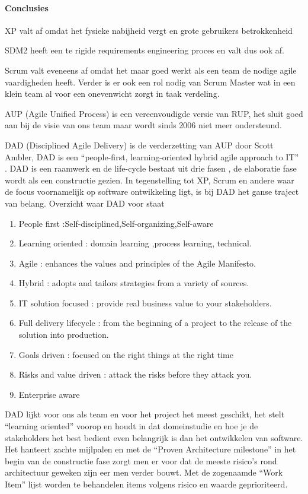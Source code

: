 \paragraph{Conclusies}
\begin{description}
\item XP valt af omdat het fysieke nabijheid vergt en grote gebruikers betrokkenheid
\item SDM2 heeft een te rigide requirements engineering proces en valt dus ook af.
\item Scrum valt eveneens af omdat het maar goed werkt als een team de nodige agile vaardigheden heeft. Verder is er ook een rol nodig van Scrum Master wat in een klein team al voor een onevenwicht zorgt in taak verdeling.
\item AUP (Agile Unified Process) is een vereenvoudigde versie van RUP, het sluit goed aan bij de visie van ons team maar wordt sinds 2006 niet meer ondersteund. 
\item DAD (Disciplined Agile Delivery) is de verderzetting van AUP door Scott Ambler, DAD is een ``people-first, learning-oriented hybrid agile approach to IT'' . DAD is een raamwerk en de life-cycle bestaat uit drie fasen , de elaboratie fase wordt als een constructie gezien. In tegenstelling tot XP, Scrum en andere waar de focus voornamelijk op software ontwikkeling ligt, is bij DAD het ganse traject van belang.
Overzicht waar DAD voor staat 
	\begin{enumerate}
		\item People first :Self-disciplined,Self-organizing,Self-aware
		\item Learning oriented : domain learning ,process learning, technical.
		\item Agile : enhances the values and principles of the Agile Manifesto.
		\item Hybrid : adopts and tailors strategies from a variety of sources.
		\item IT solution focused :  provide real business value to your stakeholders.
		\item Full delivery lifecycle : from the beginning of a project to the release of the solution into production.
		\item Goals driven : focused on the right things at the right time
		\item Risks and value driven : attack the risks before they attack you.
		\item Enterprise aware
	\end{enumerate}
	

DAD lijkt voor ons als team en voor het project het meest geschikt, het stelt
``learning oriented'' voorop en houdt in dat domeinstudie en hoe je de stakeholders het best bedient even belangrijk is dan het ontwikkelen van software. Het hanteert zachte mijlpalen en met de ``Proven Architecture milestone''  in het begin van de constructie fase zorgt men er voor dat de meeste risico's rond architectuur geweken zijn eer men verder bouwt. Met de zogenaamde ``Work Item''  lijst worden te behandelen items volgens risico en waarde geprioriteerd.

\end{description}





